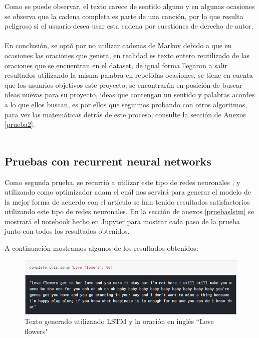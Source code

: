 \documentclass[12pt, a4paper, titlepage]{report}
\begin{document}
   		Como se puede observar, el texto carece de sentido alguno y en algunas ocasiones se observa que la cadena completa es parte de una canción, por lo que resulta peligroso si el usuario desea usar esta cadena por cuestiones de derecho de autor.\\\\
	   	En conclusión, se optó por no utilizar cadenas de Markov debido a que en ocasiones las oraciones que genera, en realidad es texto entero reutilizado de las oraciones que se encuentran en el dataset, de igual forma llegaron a salir resultados utilizando la misma palabra en repetidas ocasiones, se tiene en cuenta que los usuarios objetivos este proyecto, se encontrarán en posición de buscar ideas nuevas para su proyecto, ideas que contengan un sentido y palabras acordes a lo que ellos buscan, es por ellos que seguimos probando con otros algoritmos, para ver las matemáticas detrás de este proceso, consulte la sección de Anexos \ref{prueba2}.\\\\
	   	
	   	\subsection{Pruebas con recurrent neural networks}
	   	Como segunda prueba, se recurrió a utilizar este tipo de redes neuronales \cite{PruebaLSTM}, y utilizando como optimizador adam\cite{adam} el cuál nos servirá para generar el modelo de la mejor forma de acuerdo con el artículo \cite{adam2} se han tenido resultados satisfactorios utilizando este tipo de redes neuronales. En la sección de anexos \ref{pruebaslstm} se mostrará el notebook hecho en Jupyter para mostrar cada paso de la prueba junto con todos los resultados obtenidos.
	   	
	   	A continuación mostramos algunos de los resultados obtenidos:
	   	\begin{figure}[H]
	   		\includegraphics[width=13cm]{./imagenes/Analisis/Lstm1.png}
	   		\centering 
	   		\caption{Texto generado utilizando LSTM y la oración en inglés  ``Love flowers"}
	   	\end{figure}
   	
\end{document}
